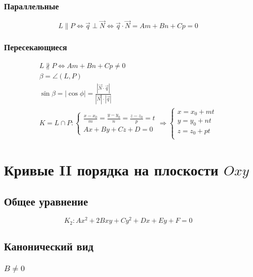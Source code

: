 \documentclass{article}
\begin{document}
\subsubsection{Параллельные}

\[
	L \parallel P \Leftrightarrow
	\vec{q} \perp \vec{N} \Leftrightarrow
	\vec{q} \cdot \vec{N} =
	Am + Bn + Cp = 0
\]

\subsubsection{Пересекающиеся}

\begin{gather*}
	L \not \parallel P \Leftrightarrow Am + Bn + Cp \ne 0 \\
	\beta = \angle(L, P) \\
	\sin \beta = |\cos \phi| = \frac{|\vec{N} \cdot \vec{q}|}{|\vec{N}| \cdot |\vec{q}|} \\
	K = L \cap P : \begin{cases}
		\frac{x - x_0}{m} = \frac{y - y_0}{n} = \frac{z - z_0}{p} = t \\
		Ax + By + Cz + D = 0
	\end{cases} \Rightarrow \begin{cases}
		x = x_0 + mt \\
		y = y_0 + nt \\
		z = z_0 + pt \\
	\end{cases}
\end{gather*}

\section{Кривые II порядка на плоскости $Oxy$}

\subsection{Общее уравнение}

\[
	K_2 : Ax^2 + 2Bxy + Cy^2 + Dx + Ey + F = 0
\]

\subsection{Канонический вид}

\subsubsection{$B \ne 0$}
\end{document}
